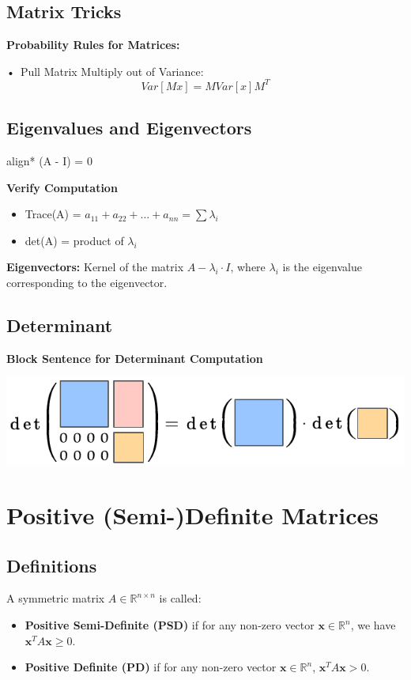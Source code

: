 \documentclass[8pt, a4paper, landscape, includeheadfoot]{extarticle}
\begin{document}
\begin{multicols*}{4}
	\subsection{Matrix Tricks}

	\textbf{Probability Rules for Matrices:}

	• Pull Matrix Multiply out of Variance:
	$$
		Var[Mx] = MVar[x]M^T
	$$

	\subsection{Eigenvalues and Eigenvectors}

	\begin{empheq}[box = \mathboxnoback]{align*}
		 \det(A - \lambda\cdot I) = 0
	\end{empheq}

	\textbf{Verify Computation}

	\begin{itemize}[leftmargin=0.29cm, itemsep=0.5pt]
		\item Trace(A) = \( a_{11} + a_{22} + \dots + a_{nn} = \sum \lambda_i \)
		\item det(A) = product of \( \lambda_i \)
	\end{itemize}

	\textbf{Eigenvectors: } Kernel of the matrix $A - \lambda_i\cdot I$, where \( \lambda_i \) is the eigenvalue corresponding to the eigenvector.

	\subsection{Determinant}

	\textbf{Block Sentence for Determinant Computation}

	\begin{center}
		\includegraphics[width = 0.8 \columnwidth]{0_images/Blocksatz.pdf}
	\end{center}

	\section{Positive (Semi-)Definite Matrices}
	\subsection{Definitions}
	A symmetric matrix \( A \in \mathbb{R}^{n \times n} \) is called:
	\begin{itemize}
		\item \textbf{Positive Semi-Definite (PSD)} if for any non-zero vector \( \mathbf{x} \in \mathbb{R}^n \), we have \( \mathbf{x}^T A \mathbf{x} \geq 0 \).
		\item \textbf{Positive Definite (PD)} if for any non-zero vector \( \mathbf{x} \in \mathbb{R}^n \), \( \mathbf{x}^T A \mathbf{x} > 0 \).
	\end{itemize}


\end{multicols*}
\end{document}

